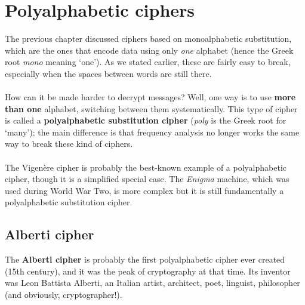 \documentclass[Lau,binding=0.6cm,oneside]{sapthesis}
\begin{document}
\chapter{Polyalphabetic ciphers}
The previous chapter discussed ciphers based on monoalphabetic substitution, which are the ones that encode data using only \textit{one} alphabet (hence the Greek root \textit{mono} meaning `one'). As we stated earlier, these are fairly easy to break, especially when the spaces between words are still there.\\\\
How can it be made harder to decrypt messages? Well, one way is to use \textbf{more than one} alphabet, switching between them systematically. This type of cipher is called a \textbf{polyalphabetic substitution cipher} (\textit{poly} is the Greek root for `many'); the main difference is that frequency analysis no longer works the same way to break these kind of ciphers.\\\\
The Vigenère cipher is probably the best-known example of a polyalphabetic cipher, though it is a simplified special case. The \textit{Enigma} machine, which was used during World War Two, is more complex but it is still fundamentally a polyalphabetic substitution cipher.

\section{Alberti cipher}
The \textbf{Alberti cipher} is probably the first polyalphabetic cipher ever created (15th century), and it was the peak of cryptography at that time. Its inventor was Leon Battista Alberti, an Italian artist, architect, poet, linguist, philosopher (and obviously, cryptographer!).\\\\
\end{document}
